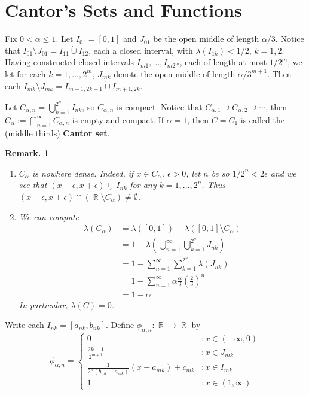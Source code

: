 \documentclass[11pt, a4paper]{memoir}
\DeclareMathOperator{\R}{{\mathbb{R}}}
\theoremstyle{change}
\theoremstyle{plain}
\theoremstyle{nonumberplain}
\newtheorem{remark}{Remark.}
\begin{document}
\section{Cantor's Sets and Functions}
Fix $0<\alpha\leq 1$.
Let $I_{01}=[0,1]$ and $J_{01}$ be the open middle of length $\alpha/3$.
Notice that $I_{01}\setminus J_{01}=I_{11}\dot{\cup}I_{12}$, each a closed interval, with $\lambda(I_{1k})<1/2$, $k=1,2$.
Having constructed closed intervals $I_{m1},\ldots,I_{m2^m}$, each of length at most $1/2^m$, we let for each $k=1,\ldots,2^m$, $J_{mk}$ denote the open middle of length $\alpha/3^{m+1}$.
Then each $I_{mk}\setminus J_{mk}=I_{m+1,2k-1}\dot{\cup}I_{m+1,2k}$.

Let $C_{\alpha,n}=\bigcup_{k=1}^{2^n}I_{nk}$, so $C_{\alpha,n}$ is compact.
Notice that $C_{\alpha,1}\supseteq C_{\alpha,2}\supseteq\cdots$, then $C_\alpha:=\bigcap_{n=1}^\infty C_{\alpha,n}$ is empty and compact.
If $\alpha=1$, then $C=C_1$ is called the (middle thirds) \textbf{Cantor set}.
\begin{remark}
    \begin{enumerate}
        \item $C_\alpha$ is nowhere dense.
            Indeed, if $x\in C_\alpha$, $\epsilon>0$, let $n$ be so $1/2^n<2\epsilon$ and we see that $(x-\epsilon,x+\epsilon)\subsetneq I_{nk}$ for any $k=1,\ldots,2^n$.
            Thus $(x-\epsilon,x+\epsilon)\cap(\R\setminus C_\alpha)\neq\emptyset$.
        \item We can compute
            \begin{align*}
                \lambda(C_\alpha)&=\lambda([0,1])-\lambda([0,1]\setminus C_\alpha)\\
                                 &= 1-\lambda\left(\bigcup_{n=1}^\infty\bigcup_{k=1}^{2^n}J_{nk}\right)\\
                                 &= 1-\sum\limits_{n=1}^\infty\sum\limits_{k=1}^{2^n}\lambda(J_{nk})\\
                                 &= 1-\sum\limits_{n=1}^\infty \alpha\frac{\alpha}{3}\left(\frac{2}{3}\right)^n\\
                                 &= 1-\alpha
            \end{align*}
            In particular, $\lambda(C)=0$.
    \end{enumerate}
\end{remark}
Write each $I_{nk}=[a_{nk},b_{nk}]$.
Define $\phi_{\alpha,n}:\R\to\R$ by
\begin{equation*}
    \phi_{\alpha,n}=\begin{cases}
        0 &: x\in(-\infty,0)\\
        \frac{2k-1}{2^{m+1}} &: x\in J_{mk}\\
        \frac{1}{2^n(b_{mk}-a_{mk})}(x-a_{mk})+c_{mk} &: x\in I_{mk}\\
        1 &: x\in(1,\infty)
    \end{cases}
\end{equation*}
\end{document}
